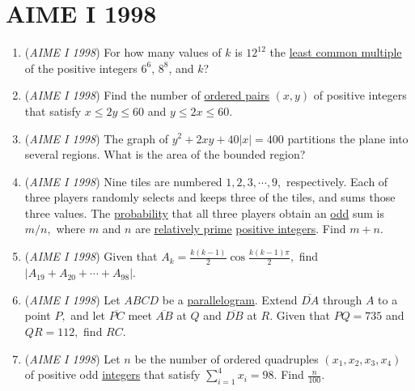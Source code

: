 \section{AIME I 1998}
        \begin{enumerate}
        	\item (\textit{AIME I 1998}) For how many values of $k$ is $12^{12}$ the \href{https://artofproblemsolving.com/wiki/index.php?title=Least\_common\_multiple}{least common multiple} of the positive integers $6^6$, $8^8$, and $k$?


 

	\item (\textit{AIME I 1998}) Find the number of \href{https://artofproblemsolving.com/wiki/index.php?title=Ordered\_pair}{ordered pairs} $(x,y)$ of positive integers that satisfy $x \le 2y \le 60$ and $y \le 2x \le 60$.


 

	\item (\textit{AIME I 1998}) The graph of $y^2 + 2xy + 40|x|= 400$ partitions the plane into several regions.  What is the area of the bounded region?


 

	\item (\textit{AIME I 1998}) Nine tiles are numbered $1, 2, 3, \cdots, 9,$ respectively.  Each of three players randomly selects and keeps three of the tiles, and sums those three values.  The \href{https://artofproblemsolving.com/wiki/index.php?title=Probability}{probability} that all three players obtain an \href{https://artofproblemsolving.com/wiki/index.php?title=Odd}{odd} sum is $m/n,$ where $m$ and $n$ are \href{https://artofproblemsolving.com/wiki/index.php?title=Relatively\_prime}{relatively prime} \href{https://artofproblemsolving.com/wiki/index.php?title=Positive\_integer}{positive integers}.  Find $m+n.$


	\item (\textit{AIME I 1998}) Given that $A_k = \frac {k(k - 1)}2\cos\frac {k(k - 1)\pi}2,$ find $\left\lvert A_{19} + A_{20} + \cdots + A_{98}\right\rvert.$


	\item (\textit{AIME I 1998}) Let $ABCD$ be a \href{https://artofproblemsolving.com/wiki/index.php?title=Parallelogram}{parallelogram}.  Extend $\overline{DA}$ through $A$ to a point $P,$ and let $\overline{PC}$ meet $\overline{AB}$ at $Q$ and $\overline{DB}$ at $R.$  Given that $PQ = 735$ and $QR = 112,$ find $RC.$


	\item (\textit{AIME I 1998}) Let $n$ be the number of ordered quadruples $(x_1,x_2,x_3,x_4)$ of positive odd \href{https://artofproblemsolving.com/wiki/index.php?title=Integer}{integers} that satisfy $\sum_{i = 1}^4 x_i = 98.$  Find $\frac n{100}.$



\end{enumerate}
